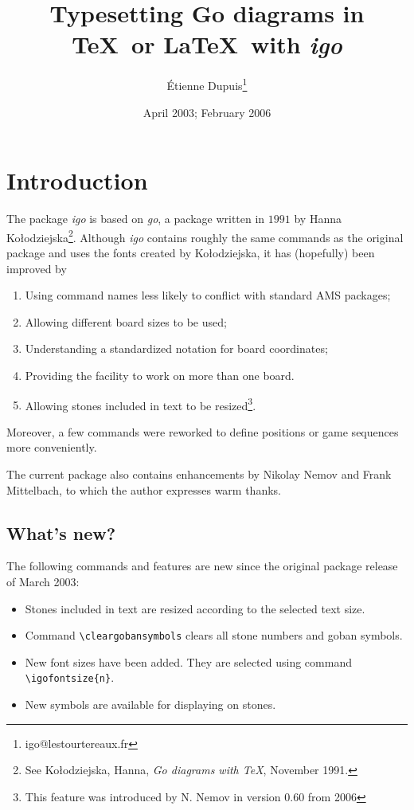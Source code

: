 \documentclass[fleqn]{article}
\begin{document}
\title{Typesetting Go diagrams in \TeX\ or \LaTeX\ with \textit{igo}}
\author{{\'E}tienne Dupuis\thanks{igo@lestourtereaux.fr}}
\date{April 2003; February 2006}
\maketitle

\section{Introduction}

The package \textit{igo} is based on \textit{go}, a package written in $1991$ by Hanna Ko{\l}odziejska\footnote{See Ko{\l}odziejska, Hanna, \textit{Go diagrams with \TeX}, November 1991.}. Although \textit{igo} contains roughly the same commands as the original package and uses the fonts created by Ko{\l}odziejska, it has (hopefully) been improved by
\begin{enumerate}
	\item
		Using command names less likely to conflict with standard AMS packages;
	\item
		Allowing different board sizes to be used;
	\item
		Understanding a standardized notation for board coordinates;
	\item
		Providing the facility to work on more than one board.
	\item
		Allowing stones included in text to be resized\footnote{This feature was introduced by N. Nemov in version 0.60 from 2006}.    
\end{enumerate}
Moreover, a few commands were reworked to define positions or game sequences more conveniently. 

The current package also contains enhancements by Nikolay Nemov and Frank Mittelbach, to which the author expresses warm thanks.

\subsection{What's new?}

The following commands and features are new since the original package release of March 2003:
\begin{itemize}
	\item
		Stones included in text are resized according to the selected text size.
	\item
		Command \verb|\cleargobansymbols| clears all stone numbers and goban symbols.
	\item
		New font sizes have been added. They are selected using command \verb|\igofontsize{n}|.
	\item
		New symbols are available for displaying on stones.
\end{itemize}
\end{document}
